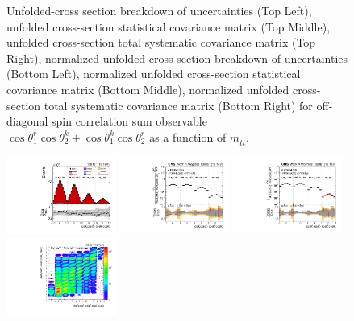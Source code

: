 \begin{figure}[htb]
\begin{center}
\caption{Unfolded-cross section breakdown of uncertainties (Top Left), unfolded cross-section statistical covariance matrix (Top Middle), unfolded cross-section total systematic covariance matrix (Top Right), normalized unfolded-cross section breakdown of uncertainties (Bottom Left), normalized unfolded cross-section statistical covariance matrix (Bottom Middle), normalized unfolded cross-section total systematic covariance matrix (Bottom Right) for off-diagonal spin correlation sum observable $\cos\theta_{1}^{r}\cos\theta_{2}^{k}+\cos\theta_{1}^{k}\cos\theta_{2}^{r}$ as a function of $m_{t\bar{t}}$.}
\label{fig:c_Prk_mttbar_uncertainties}
\end{center}
\end{figure}
\clearpage
\begin{figure}[htb]
\begin{center}
 \includegraphics[width=0.32\textwidth]{fig_fullRun2UL/controlplots/combined/Hyp_LLBarCMrk_vs_TTBarMass.pdf}
 \includegraphics[width=0.32\textwidth]{fig_fullRun2UL/unfolding/combined/UnfoldedResults_c_Mrk_mttbar.pdf}
 \includegraphics[width=0.32\textwidth]{fig_fullRun2UL/unfolding/combined/UnfoldedResultsNorm_c_Mrk_mttbar.pdf} \\
 \includegraphics[width=0.32\textwidth]{fig_fullRun2UL/unfolding/combined/ResponseMatrix_c_Mrk_mttbar.pdf}

\end{center}
\end{figure}

